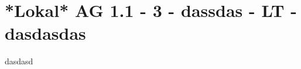 \section{*Lokal* AG 1.1 - 3 - dassdas - LT - dasdasdas}

\begin{beispiel}[AG 1.1]{1}
dasdasd
\end{beispiel}